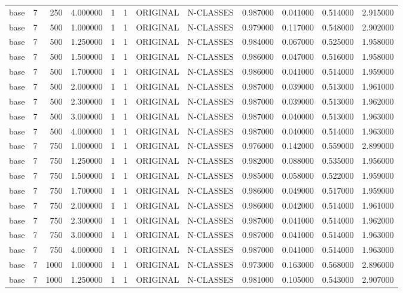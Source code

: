 \begin{tabular}{lrrrllllrrrr}
base & 7 & 250 & 4.000000 & 1 & 1 & ORIGINAL & N-CLASSES & 0.987000 & 0.041000 & 0.514000 & 2.915000 \\
base & 7 & 500 & 1.000000 & 1 & 1 & ORIGINAL & N-CLASSES & 0.979000 & 0.117000 & 0.548000 & 2.902000 \\
base & 7 & 500 & 1.250000 & 1 & 1 & ORIGINAL & N-CLASSES & 0.984000 & 0.067000 & 0.525000 & 1.958000 \\
base & 7 & 500 & 1.500000 & 1 & 1 & ORIGINAL & N-CLASSES & 0.986000 & 0.047000 & 0.516000 & 1.958000 \\
base & 7 & 500 & 1.700000 & 1 & 1 & ORIGINAL & N-CLASSES & 0.986000 & 0.041000 & 0.514000 & 1.959000 \\
base & 7 & 500 & 2.000000 & 1 & 1 & ORIGINAL & N-CLASSES & 0.987000 & 0.039000 & 0.513000 & 1.961000 \\
base & 7 & 500 & 2.300000 & 1 & 1 & ORIGINAL & N-CLASSES & 0.987000 & 0.039000 & 0.513000 & 1.962000 \\
base & 7 & 500 & 3.000000 & 1 & 1 & ORIGINAL & N-CLASSES & 0.987000 & 0.040000 & 0.513000 & 1.963000 \\
base & 7 & 500 & 4.000000 & 1 & 1 & ORIGINAL & N-CLASSES & 0.987000 & 0.040000 & 0.514000 & 1.963000 \\
base & 7 & 750 & 1.000000 & 1 & 1 & ORIGINAL & N-CLASSES & 0.976000 & 0.142000 & 0.559000 & 2.899000 \\
base & 7 & 750 & 1.250000 & 1 & 1 & ORIGINAL & N-CLASSES & 0.982000 & 0.088000 & 0.535000 & 1.956000 \\
base & 7 & 750 & 1.500000 & 1 & 1 & ORIGINAL & N-CLASSES & 0.985000 & 0.058000 & 0.522000 & 1.959000 \\
base & 7 & 750 & 1.700000 & 1 & 1 & ORIGINAL & N-CLASSES & 0.986000 & 0.049000 & 0.517000 & 1.959000 \\
base & 7 & 750 & 2.000000 & 1 & 1 & ORIGINAL & N-CLASSES & 0.986000 & 0.042000 & 0.514000 & 1.961000 \\
base & 7 & 750 & 2.300000 & 1 & 1 & ORIGINAL & N-CLASSES & 0.987000 & 0.041000 & 0.514000 & 1.962000 \\
base & 7 & 750 & 3.000000 & 1 & 1 & ORIGINAL & N-CLASSES & 0.987000 & 0.041000 & 0.514000 & 1.963000 \\
base & 7 & 750 & 4.000000 & 1 & 1 & ORIGINAL & N-CLASSES & 0.987000 & 0.041000 & 0.514000 & 1.963000 \\
base & 7 & 1000 & 1.000000 & 1 & 1 & ORIGINAL & N-CLASSES & 0.973000 & 0.163000 & 0.568000 & 2.896000 \\
base & 7 & 1000 & 1.250000 & 1 & 1 & ORIGINAL & N-CLASSES & 0.981000 & 0.105000 & 0.543000 & 2.907000 \\

\end{tabular}
